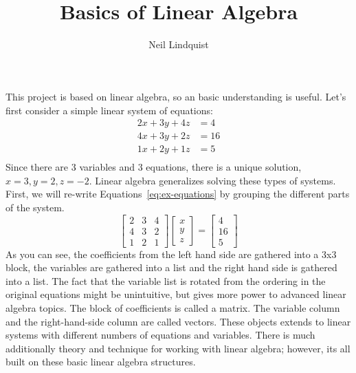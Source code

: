 \documentclass[12pt,]{article}
\title{ \\ \Large Basics of Linear Algebra}
\author{Neil Lindquist}
\date{}
\begin{document}
\maketitle

This project is based on linear algebra, so an basic understanding is useful.
Let's first consider a simple linear system of equations:
\begin{equation}
	\label{eq:ex-equations}
	\begin{aligned}
		2x + 3y + 4z &= 4 \\
		4x + 3y + 2z &= 16 \\
		1x + 2y + 1z &= 5 \\
	\end{aligned}
\end{equation}
Since there are 3 variables and 3 equations, there is a unique solution, \({x=3}, {y=2}, {z=-2}\).
Linear algebra generalizes solving these types of systems.
First, we will re-write Equations~\ref{eq:ex-equations} by grouping the different parts of the system.
\begin{equation}
\label{eq:ex-matvec}
	\begin{bmatrix}
		2 & 3 & 4 \\ 4 & 3 & 2 \\ 1 & 2 & 1
	\end{bmatrix}
	\begin{bmatrix} x \\ y \\ z \end{bmatrix}
	=
	\begin{bmatrix} 4 \\ 16 \\ 5 \end{bmatrix}
\end{equation}
As you can see, the coefficients from the left hand side are gathered into a 3x3 block, the variables are gathered into a list and the right hand side is gathered into a list.
The fact that the variable list is rotated from the ordering in the original equations might be unintuitive, but gives more power to advanced linear algebra topics.
The block of coefficients is called a matrix.
The variable column and the right-hand-side column are called vectors.
These objects extends to linear systems with different numbers of equations and variables.
There is much additionally theory and technique for working with linear algebra; however, its all built on these basic linear algebra structures.
\end{document}
